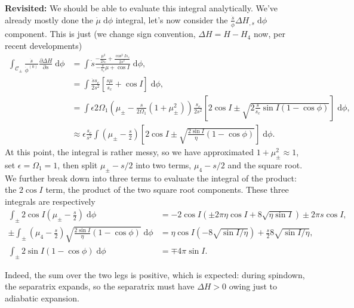 \documentclass[11pt,
        usenames, %
        dvipsnames %
    ]{article}
\newcommand*{\pd}[2]{\frac{\partial#1}{\partial#2}}
\newcommand*{\p}[1]{\left(#1\right)}
\newcommand*{\s}[1]{\left[#1\right]}
\begin{document}
\textbf{Revisited:} We should be able to evaluate this integral analytically.
We've already mostly done the $\dot{\mu}\;\mathrm{d}\phi$ integral, let's now
consider the $\frac{\dot{s}}{\dot{\phi}}\Delta H_{,s}\;\mathrm{d}\phi$
component. This is just (we change sign convention, $\Delta H = H - H_4$ now,
per recent developments)
\begin{align*}
    \int_{\mathcal{C}_{\pm}} \frac{\dot{s}}{\dot{\phi}^{(0)}}
            \pd{\Delta H}{s}\;\mathrm{d}\phi &=
        \int \dot{s}\frac{-\frac{\mu^2}{2s_c} + \frac{\cos^2 Is_c}{2s^2}}{
            -\frac{s}{s_c}\mu + \cos I}\;\mathrm{d}\phi,\\
        &= \int \frac{\dot{s}s_c}{2s^2}\s{\frac{s\mu}{s_c} + \cos
            I}\;\mathrm{d}\phi,\\
        &= \int \epsilon 2\Omega_1
            \p{\mu_{\pm} - \frac{s}{2\Omega_1}\p{1 + \mu_{\pm}^2}}
                \frac{s_c}{2s^2} \s{
                    2\cos I \pm
                    \sqrt{2\frac{s}{s_c} \sin I\p{1 - \cos \phi}}}
                \;\mathrm{d}\phi,\\
        &\approx \epsilon \frac{s_c}{s^2} \int
            \p{\mu_{\pm} - \frac{s}{2}}
                \s{2\cos I \pm \sqrt{\frac{2 \sin I}{\eta}\p{1 - \cos \phi}}}
                \;\mathrm{d}\phi.
\end{align*}
At this point, the integral is rather messy, so we have approximated $1 +
\mu_{\pm}^2 \approx 1$, set $\epsilon = \Omega_1 = 1$, then split $\mu_{\pm} -
s/2$ into two terms, $\mu_4 - s/2$ and the square root. We further break down
into three terms to evaluate the integral of the product: the $2\cos I$ term,
the product of the two square root components. These three integrals are
respectively
\begin{align*}
    \int_{\pm} 2\cos I \p{\mu_{\pm} - \frac{s}{2}}\;\mathrm{d}\phi &=
        -2\cos I\p{\pm 2\pi \eta \cos I + 8\sqrt{\eta \sin I}}
        \pm 2\pi s\cos I,\\
    \pm \int_{\pm} \p{\mu_4 - \frac{s}{2}}
            \sqrt{\frac{2\sin I}{\eta}\p{1 - \cos \phi}} \;\mathrm{d}\phi &=
        \eta \cos I \p{-8\sqrt{\sin I / \eta}}
            + \frac{s}{2}8\sqrt{\sin I/\eta} ,\\
    \int_{\pm} 2\sin I \p{1 - \cos \phi}\;\mathrm{d}\phi &= \mp 4\pi \sin I.
\end{align*}

Indeed, the sum over the two legs is positive, which is expected: during
spindown, the separatrix expands, so the separatrix must have $\Delta H > 0$
owing just to adiabatic expansion.
\end{document}
